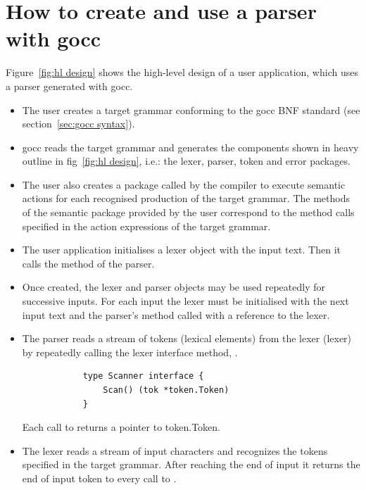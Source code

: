 \documentclass[12pt]{article}
\begin{document}
\section{How to create and use a parser with gocc}
	Figure~\ref{fig:hl design} shows the high-level design of a user application, which uses a parser generated with gocc.
	\begin{itemize}
		\item The user creates a target grammar conforming to the gocc BNF standard (see section~\ref{sec:gocc syntax}).

		\item gocc reads the target grammar and generates the components shown in heavy outline in fig~\ref{fig:hl design}, i.e.: the lexer, parser, token and error packages.

		\item The user also creates a package called by the compiler to execute semantic actions for each recognised production of the target grammar. The methods of the semantic package provided by the user correspond to the method calls specified in the action expressions of the target grammar.

		\item The user application initialises a lexer object with the input text. Then it calls the  method of the parser.

		\item Once created, the lexer and parser objects may be used repeatedly for successive inputs. For each input the lexer must be initialised with the next input text and the parser's  method called with a reference to the lexer.

		\item The parser reads a stream of tokens (lexical elements) from the lexer (lexer) by repeatedly calling the lexer interface method, .

		\begin{verbatim}
			type Scanner interface {
			    Scan() (tok *token.Token)
			}
		\end{verbatim}

		Each call to  returns a pointer to token.Token.

		\item The lexer reads a stream of input characters and recognizes the tokens specified in the target grammar. After reaching the end of input it returns the end of input token to every call to .


\end{itemize}
\end{document}
